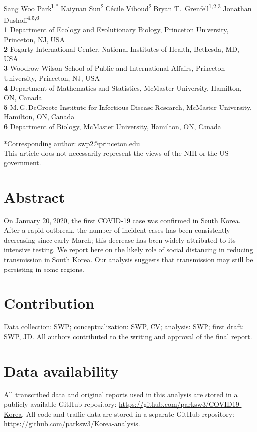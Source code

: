 \begin{flushleft}{
	\Large
	\textbf{}
}
\newline
\\
Sang Woo Park\textsuperscript{1,*}
Kaiyuan Sun\textsuperscript{2}
C\'ecile Viboud\textsuperscript{2}
Bryan T.\ Grenfell\textsuperscript{1,2,3}
Jonathan Dushoff\textsuperscript{4,5,6}
\\
\bigskip
\textbf{1} Department of Ecology and Evolutionary Biology, Princeton University, Princeton, NJ, USA
\\
\textbf{2} Fogarty International Center, National Institutes of Health, Bethesda, MD, USA
\\
\textbf{3} Woodrow Wilson School of Public and International Affairs, Princeton University, Princeton, NJ, USA
\\
\textbf{4} Department of Mathematics and Statistics, McMaster University, Hamilton, ON, Canada
\\
\textbf{5} M.\,G.\,DeGroote Institute for Infectious Disease Research, McMaster University, Hamilton, ON, Canada
\\
\textbf{6} Department of Biology, McMaster University, Hamilton, ON, Canada
\\
\bigskip

*Corresponding author: swp2@princeton.edu\\
This article does not necessarily represent the views of the NIH or the US government.
\end{flushleft}

\section*{Abstract}

On January 20, 2020, the first COVID-19 case was confirmed in South Korea.
After a rapid outbreak, the number of incident cases has been consistently decreasing since early March;
this decrease has been widely attributed to its intensive testing.
We report here on the likely role of social distancing in reducing transmission in South Korea.
Our analysis suggests that transmission may still be persisting in some regions.

\section*{Contribution}

Data collection: SWP; conceptualization: SWP, CV; analysis: SWP; first draft: SWP, JD. All authors contributed to the writing and approval of the final report.

\section*{Data availability}

All transcribed data and original reports used in this analysis are stored in a publicly available GitHub repository: \url{https://github.com/parksw3/COVID19-Korea}.
All code and traffic data are stored in a separate GitHub repository: \url{https://github.com/parksw3/Korea-analysis}.
